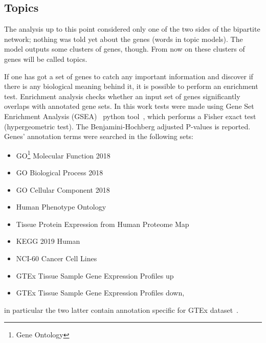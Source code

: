 \FloatBarrier
\subsection{Topics}
The analysis up to this point considered only one of the two sides of the bipartite network; nothing was told yet about the genes (words in topic models).
The model outputs some clusters of genes, though.  From now on these clusters of genes will be called topics.

If one has got a set of genes to catch any important information and discover if there is any biological meaning behind it, it is possible to perform an enrichment test. Enrichment analysis checks whether an input set of genes significantly overlaps with annotated gene sets.
In this work tests were made using Gene Set Enrichment Analysis (GSEA)~\cite{subramanian2005gene} python tool~\cite{Kuleshov2016}, which performs a Fisher exact test (hypergeometric test). The Benjamini-Hochberg adjusted P-values is reported. Genes' annotation terms were searched in the following sets: 
\begin{itemize}
		\item GO\footnote{Gene Ontology} Molecular Function 2018
		\item GO Biological Process 2018
		\item GO Cellular Component 2018
		\item Human Phenotype Ontology
		\item Tissue Protein Expression from Human Proteome Map
		\item KEGG 2019 Human
		\item NCI-60 Cancer Cell Lines
		\item GTEx Tissue Sample Gene Expression Profiles up
		\item GTEx Tissue Sample Gene Expression Profiles down,
\end{itemize}
in particular the two latter contain annotation specific for GTEx dataset~\cite{Ardlie2015}.

